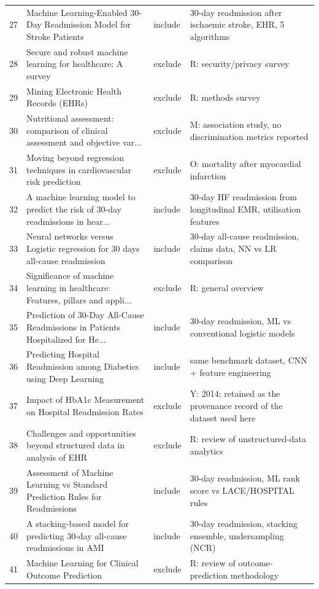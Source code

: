 \begin{longtable}{rp{4.9cm}p{1.35cm}p{4.6cm}}
27 & Machine Learning-Enabled 30-Day Readmission Model for Stroke Patients & include & 30-day readmission after ischaemic stroke, EHR, 5 algorithms \\
28 & Secure and robust machine learning for healthcare: A survey & exclude & R: security/privacy survey \\
29 & Mining Electronic Health Records (EHRs) & exclude & R: methods survey \\
30 & Nutritional assessment: comparison of clinical assessment and objective var... & exclude & M: association study, no discrimination metrics reported \\
31 & Moving beyond regression techniques in cardiovascular risk prediction & exclude & O: mortality after myocardial infarction \\
32 & A machine learning model to predict the risk of 30-day readmissions in hear... & include & 30-day HF readmission from longitudinal EMR, utilisation features \\
33 & Neural networks versus Logistic regression for 30 days all-cause readmission & include & 30-day all-cause readmission, claims data, NN vs LR comparison \\
34 & Significance of machine learning in healthcare: Features, pillars and appli... & exclude & R: general overview \\
35 & Prediction of 30-Day All-Cause Readmissions in Patients Hospitalized for He... & include & 30-day readmission, ML vs conventional logistic models \\
36 & Predicting Hospital Readmission among Diabetics using Deep Learning & include & same benchmark dataset, CNN + feature engineering \\
37 & Impact of HbA1c Measurement on Hospital Readmission Rates & exclude & Y: 2014; retained as the provenance record of the dataset used here \\
38 & Challenges and opportunities beyond structured data in analysis of EHR & exclude & R: review of unstructured-data analytics \\
39 & Assessment of Machine Learning vs Standard Prediction Rules for Readmissions & include & 30-day readmission, ML rank score vs LACE/HOSPITAL rules \\
40 & A stacking-based model for predicting 30-day all-cause readmissions in AMI & include & 30-day readmission, stacking ensemble, undersampling (NCR) \\
41 & Machine Learning for Clinical Outcome Prediction & exclude & R: review of outcome-prediction methodology \\

\end{longtable}
